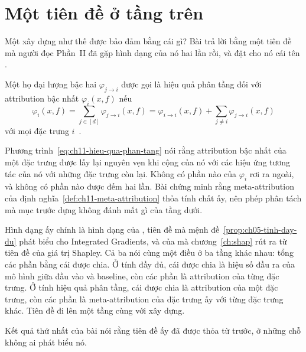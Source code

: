 \section{Một tiên đề ở tầng trên}
\label{sec:ch11-tien-de-o-tang-tren}

%
Một xây dựng như thế được bảo đảm bằng cái gì? Bài trả lời bằng một tiên đề mà
người đọc Phần~II đã gặp hình dạng của nó hai lần rồi, và đặt cho nó cái tên
.

\begin{definition}
  \label{def:ch11-hieu-qua-phan-tang}
  Một họ đại lượng bậc hai $\varphi_{j \to i}$ được gọi là hiệu quả phân tầng
  đối với attribution bậc nhất $\varphi_i(x,f)$ nếu
  \begin{equation}
    \label{eq:ch11-hieu-qua-phan-tang}
    \varphi_i(x,f)
      = \sum_{j \in [d]} \varphi_{j \to i}(x,f)
      = \varphi_{i \to i}(x,f) + \sum_{j \neq i} \varphi_{j \to i}(x,f)
  \end{equation}
  với mọi đặc trưng $i$~\autocite{p23metagame}.
\end{definition}

Phương trình~\ref{eq:ch11-hieu-qua-phan-tang} nói rằng attribution bậc nhất của
một đặc trưng được lấy lại nguyên vẹn khi cộng  của nó với các
hiệu ứng tương tác của nó với những đặc trưng còn lại. Không có phần nào của
$\varphi_i$ rơi ra ngoài, và không có phần nào được đếm hai lần. Bài chứng minh
rằng meta-attribution của định nghĩa~\ref{def:ch11-meta-attribution} thỏa tính
chất ấy, nên phép phân tách mà mục trước dựng không đánh mất gì của tầng dưới.

Hình dạng ấy chính là hình dạng của , tiên đề mà
mệnh đề~\ref{prop:ch05-tinh-day-du} phát biểu cho Integrated Gradients, và của
 mà chương~\ref{ch:shap} rút ra từ tiên đề của giá trị
Shapley. Cả ba nói cùng một điều ở ba tầng khác nhau: tổng các phần bằng cái
được chia. Ở tính đầy đủ, cái được chia là hiệu số đầu ra của mô hình giữa đầu
vào và baseline, còn các phần là attribution của từng đặc trưng. Ở tính hiệu
quả phân tầng, cái được chia là attribution của một đặc trưng, còn các phần là
meta-attribution của đặc trưng ấy với từng đặc trưng khác. Tiên đề đi lên một
tầng cùng với xây dựng.

Kết quả thứ nhất của bài nói rằng tiên đề ấy đã được thỏa từ trước, ở những chỗ
không ai phát biểu nó.

